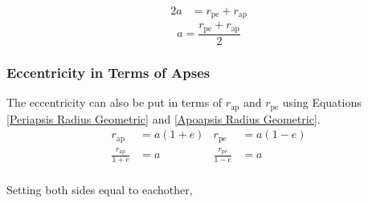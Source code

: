 \documentclass{article}
\begin{document}
\begin{align*}
    2a & = r_\text{pe}+r_\text{ap}
\end{align*}
\begin{equation}\label{SMA in terms of apses}
    a = \frac{r_\text{pe}+r_\text{ap}}{2}
\end{equation}

\subsubsection{Eccentricity in Terms of Apses}

The eccentricity can also be put in terms of $r_\text{ap}$ and $r_\text{pe}$ using Equations \eqref{Periapsis Radius Geometric} and \eqref{Apoapsis Radius Geometric}.
\begin{align*}
    r_\text{ap}             & =a(1+e) & r_\text{pe}             & =a(1-e) \\
    \frac{r_\text{ap}}{1+e} & =a      & \frac{r_\text{pe}}{1-e} & =a      \\
\end{align*}

Setting both sides equal to eachother,
\end{document}
